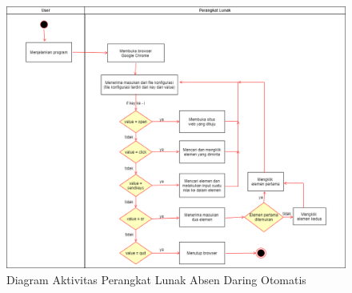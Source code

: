 \begin{figure}[H]
	\centering
	\includegraphics[scale=0.4]{Gambar/ActivityAplikasi.png}
	\caption{Diagram Aktivitas Perangkat Lunak Absen Daring Otomatis} 
	\label{fig:ActivityAplikasi}
\end{figure}

